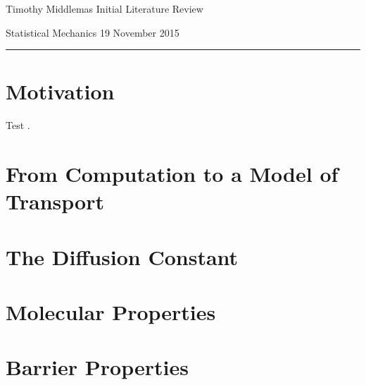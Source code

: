 \documentclass[letter]{article}
\begin{document}
                                                             

\noindent Timothy Middlemas \hfill Initial Literature Review

\noindent Statistical Mechanics \hfill 19 November 2015

\vspace{1 mm}

\hrule

\vspace{1 mm}

\section{Motivation}
Test \cite{LLFluids}.
\section{From Computation to a Model of Transport}

\section{The Diffusion Constant}

\section{Molecular Properties}

\section{Barrier Properties}



\end{document}
